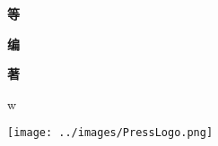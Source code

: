 \documentclass{ctexbook}%
\begin{document}
{\begin{minipage}[c][\textheight]{0.15\linewidth}
\begin{center}
\begin{turn}{90}
          {\Large{\textbf{\kaishu 等}}}%
          \end{turn}
          \begin{turn}{90}
          {\Large{\textbf{\kaishu 编}}}%
          \end{turn}
          \begin{turn}{90}
          {\Large{\textbf{\kaishu 著}}}%
          \end{turn}
      \end{center}
  \end{minipage}
  \begin{minipage}[c][\textheight]{0.13\linewidth}
      \begin{center}
        {\Large{\ThePublisherName}}
      w\end{center}
  \end{minipage}
   \begin{minipage}[c][\textheight]{0.1\linewidth}
     \texttt{[image: ../images/PressLogo.png]}%
  \end{minipage}
}%
\end{document}
